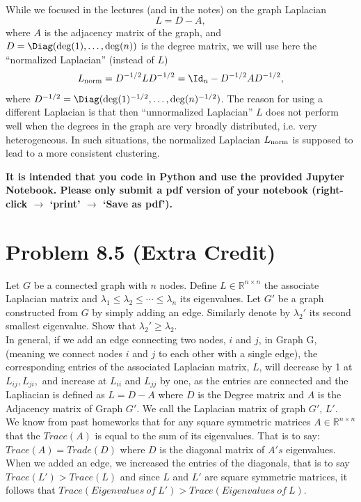 \documentclass[12pt,twoside]{article}
\newcommand{\R}{\mathbb{R}}
\begin{document}
	While we focused in the lectures (and in the notes) on the graph Laplacian
	$$
	L = D - A,
	$$
	where $A$ is the adjacency matrix of the graph, and $D = \Diag(\deg(1), \dots, \deg(n))$ is the degree matrix, we will use here the ``normalized Laplacian'' (instead of $L$)
	$$
	L_{\rm norm} = D^{-1/2} L D^{-1/2} = \Id_n - D^{-1/2} A D^{-1/2},
	$$
	where $D^{-1/2} = \Diag(\deg(1)^{-1/2}, \dots, \deg(n)^{-1/2})$. The reason for using a different Laplacian is that then ``unnormalized Laplacian'' $L$ does not perform well when the degrees in the graph are very broadly distributed, i.e. very heterogeneous. In such situations, the normalized Laplacian $L_{\rm norm}$ is supposed to lead to a more consistent clustering.

	\textbf{It is intended that you code in Python and use the provided Jupyter Notebook. Please only submit a pdf version of your notebook (right-click $\to$ `print' $\to$ `Save as pdf').}



\vspace{5mm}

\section{Problem 8.5 (Extra Credit)}
	Let $G$ be a connected graph with $n$ nodes. Define $L \in \R^{n \times n}$ the associate Laplacian matrix and $\lambda_1 \leq \lambda_2 \leq \cdots \leq \lambda_n$ its eigenvalues. Let $G'$ be a graph constructed from $G$ by simply adding an edge. Similarly denote by $\lambda_2'$ its second smallest eigenvalue. Show that  $\lambda_2' \geq \lambda_2$. \\

 

In general, if we add an edge connecting two nodes, $i$ and $j$, in Graph G, (meaning we connect nodes $i$ and $j$ to each other with a single edge), the corresponding entries of the associated Laplacian matrix, $L$, will decrease by 1 at $L_{ij},  L_{ji},$ and increase at $L_{ii}$ and $L_{jj}$ by one, as the entries are connected and the Lapliacian is defined as $L=D-A$ where $D$ is the Degree matrix and $A$ is the Adjacency matrix of Graph $G'$. We call the Laplacian matrix of graph $G'$, $L'$. \\

We know from past homeworks that for any square symmetric matrices $A\in \R^{n \times n}$ that the $Trace(A)$ is equal to the sum of its eigenvalues. That is to say: $Trace(A) = Trade(D)$ where $D$ is the diagonal matrix of $A's$ eigenvalues. When we added an edge, we increased the entries of the diagonals, that is to say $Trace(L') > Trace(L)$ and since $L$ and $L'$ are square symmetric matrices, it follows that $Trace(Eigenvalues \ of \ L') > Trace(Eigenvalues \ of \ L)$. \\
\end{document}
